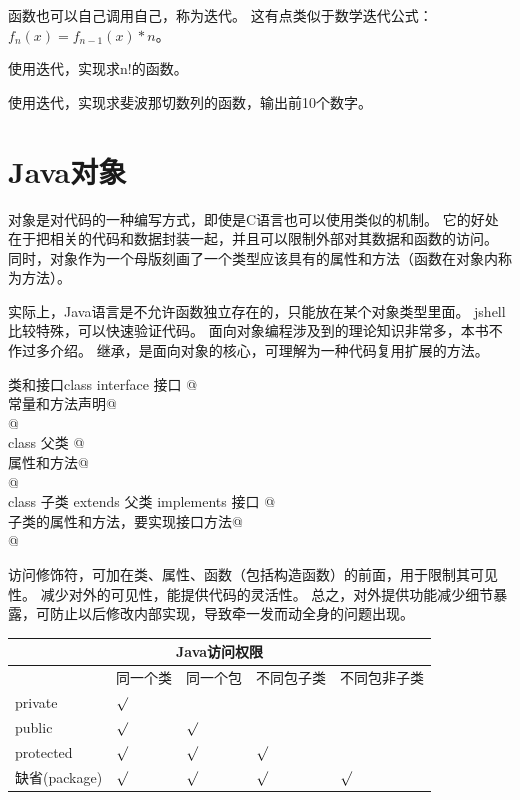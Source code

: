 \noindent
函数也可以自己调用自己，称为迭代。
这有点类似于数学迭代公式：$f_n(x) = f_{n-1}(x)*n$。

\bigskip
\begin{exercise}
	使用迭代，实现求n!的函数。
\end{exercise}

\begin{exercise}
	使用迭代，实现求斐波那切数列的函数，输出前10个数字。
\end{exercise}

\section{Java对象}
对象是对代码的一种编写方式，即使是C语言也可以使用类似的机制。
它的好处在于把相关的代码和数据封装一起，并且可以限制外部对其数据和函数的访问。
同时，对象作为一个母版刻画了一个类型应该具有的属性和方法（函数在对象内称为方法）。

实际上，Java语言是不允许函数独立存在的，只能放在某个对象类型里面。
jshell比较特殊，可以快速验证代码。
面向对象编程涉及到的理论知识非常多，本书不作过多介绍。
继承，是面向对象的核心，可理解为一种代码复用扩展的方法。

\begin{definition}{类和接口}{class}
	\lstinline@[修饰符] interface 接口 { @ \\
	\lstinline@	常量和方法声明@ \\
	\lstinline@}@ \\
	\lstinline@[修饰符] class 父类 { @ \\
	\lstinline@	属性和方法@ \\
	\lstinline@}@ \\
	\lstinline@[修饰符] class 子类 extends 父类 implements 接口 {@ \\
	\lstinline@	子类的属性和方法，要实现接口方法@ \\
	\lstinline@}@
\end{definition}

访问修饰符，可加在类、属性、函数（包括构造函数）的前面，用于限制其可见性。
减少对外的可见性，能提供代码的灵活性。
总之，对外提供功能减少细节暴露，可防止以后修改内部实现，导致牵一发而动全身的问题出现。

\begin{table}[!htbp]\centering
	\begin{tabular}{|p{3cm}|p{1.6cm}|p{1.6cm}|p{2cm}|p{2.4cm}|}
	\toprule
	\multicolumn{5}{|c|}{Java访问权限}\\ 
	\midrule
	&同一个类&同一个包&不同包子类&不同包非子类\\ \hline
	private&$\surd$&&&\\ \hline
	public&$\surd$&$\surd$&&\\\hline
	protected&$\surd$&$\surd$&$\surd$&\\ \hline
	缺省(package)&$\surd$&$\surd$&$\surd$&$\surd$\\
	\bottomrule
	\end{tabular}
\end{table}

